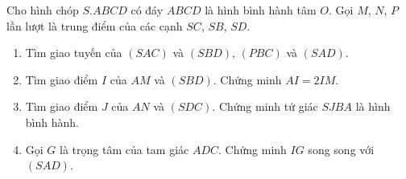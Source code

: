 \begin{bt}%
Cho hình chóp $S.ABCD$ có đáy $ABCD$ là hình bình hành tâm $O$. Gọi $M$, $N$, $P$ lần lượt là trung điểm của các cạnh $SC$, $SB$, $SD$.
\begin{enumerate}
\item Tìm giao tuyến của $(SAC)$ và $(SBD)$, $(PBC)$ và $(SAD)$.
\item Tìm giao điểm $I$ của $AM$ và $(SBD)$. Chứng minh $AI=2IM$.
\item Tìm giao điểm $J$ của $AN$ và $(SDC)$. Chứng minh tứ giác $SJBA$ là hình bình hành.
\item Gọi $G$ là trọng tâm của tam giác $ADC$. Chứng minh $IG$ song song với $(SAD)$.
\end{enumerate}
\end{bt}
